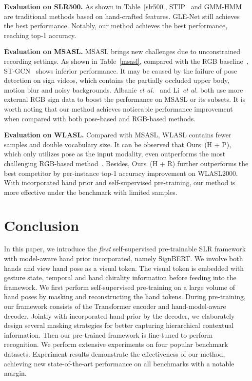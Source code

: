 \documentclass[10pt,twocolumn,letterpaper]{article}
\begin{document}
\noindent \textbf{Evaluation on SLR500.}
As shown in Table~\ref{slr500}, STIP~\cite{laptev2005space} and GMM-HMM~\cite{tang2015real} are traditional methods based on hand-crafted features. 
GLE-Net \cite{hu2020global} still achieves the best performance. 
Notably, our method achieves the best performance, reaching  top-1 accuracy.



\noindent \textbf{Evaluation on MSASL.}
MSASL brings new challenges due to unconstrained recording settings.
As shown in Table~\ref{msasl}, compared with the RGB baseline~\cite{joze2018ms}, ST-GCN~\cite{yan2018spatial} shows inferior performance. 
It may be caused by the failure of pose detection on sign videos, which contains the partially occluded upper body, motion blur and noisy backgrounds. 
Albanie \emph{et al.}~\cite{albanie2020bsl} and Li~\emph{et al.} \cite{li2020transfer} both use more external RGB sign data to boost the performance on MSASL or its subsets. 
It is worth noting that our method achieves noticeable performance improvement when compared with both pose-based and RGB-based methods.


\noindent \textbf{Evaluation on WLASL.}
Compared with MSASL, WLASL contains fewer samples and double vocabulary size. 
It can be observed that Ours~(H + P), which only utilizes pose as the input modality, even outperforms the most challenging RGB-based method~\cite{albanie2020bsl}.
Besides, Ours~(H + R) further outperforms the best competitor by  per-instance top-1 accuracy improvement on WLASL2000.
With incorporated hand prior and self-supervised pre-training, our method is more effective under the benchmark with limited samples.



\section{Conclusion}
In this paper, we introduce the \emph{first} self-supervised pre-trainable SLR framework with model-aware hand prior incorporated, namely SignBERT.
We involve both hands and view hand pose as a visual token.
The visual token is embedded with gesture state, temporal and hand chirality information before feeding into the framework.
We first perform self-supervised pre-training on a large volume of hand poses by masking and reconstructing the hand tokens.
During pre-training, our framework consists of the Transformer encoder and hand-model-aware decoder.
Jointly with incorporated hand prior by the decoder, we elaborately design several masking strategies for better capturing hierarchical contextual information.
Then our pre-trained framework is fine-tuned to perform recognition.
We perform extensive experiments on four popular benchmark datasets.
Experiment results demonstrate the effectiveness of our method, achieving new state-of-the-art performance on all benchmarks with a notable margin.
\end{document}

